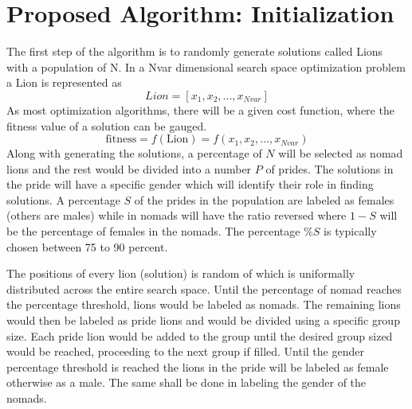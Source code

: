 \section{Proposed Algorithm: Initialization}
The first step of the algorithm is to randomly generate solutions called Lions with a population of N. In a Nvar dimensional search space optimization problem a Lion is represented as
$$Lion = [x_1, x_2,..., x_{Nvar}]$$
As most optimization algorithms, there will be a given cost function, where the fitness value of a solution can be gauged.
$$\text{fitness} = f(\text{Lion}) = f(x_1, x_2,..., x_{Nvar})$$
Along with generating the solutions, a percentage of $N$ will be selected as nomad lions and the rest would be divided into a number $P$ of prides. The solutions in the pride will have a specific gender which will identify their role in finding solutions. A percentage $S$ of the prides in the population are labeled as females (others are males) while in nomads will have the ratio reversed where $1-S$ will be the percentage of females in the nomads. The percentage $\%S$ is typically chosen between 75 to 90 percent.

The positions of every lion (solution) is random of which is uniformally distributed across the entire search space. Until the percentage of nomad reaches the percentage threshold, lions would be labeled as nomads. The remaining lions would then be labeled as pride lions and would be divided using a specific group size. Each pride lion would be added to the group until the desired group sized would be reached, proceeding to the next group if filled. Until the gender percentage threshold is reached the lions in the pride will be labeled as female otherwise as a male. The same shall be done in labeling the gender of the nomads.

